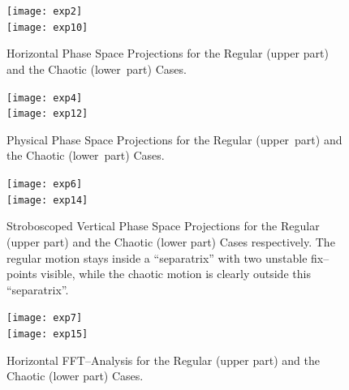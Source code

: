 \documentclass[a4paper,11pt]{report}
\begin{document}
\begin{figure}[H]
\begin{center}
  \mbox{\texttt{[image: exp2]}}
  \\[5mm]
  \mbox{\texttt{[image: exp10]}}
 \caption{Horizontal Phase Space Projections for the
   Regular (upper part) and the Chaotic \mbox{(lower part)} Cases.}
 \label{H-proj}
\end{center}
\end{figure}

\begin{figure}[H]
\begin{center}
  \mbox{\texttt{[image: exp4]}}
  \\[5mm]
  \mbox{\texttt{[image: exp12]}}
 \caption{Physical Phase Space Projections for the Regular
   \mbox{(upper part)} and the Chaotic \mbox{(lower part)} Cases.}
 \label{P-proj}
\end{center}
\end{figure}

\begin{figure}[H]
\begin{center}
  \mbox{\texttt{[image: exp6]}}
  \\[5mm]
  \mbox{\texttt{[image: exp14]}}
 \caption{\small{Stroboscoped Vertical Phase Space Projections
     for the Regular (upper part) and the Chaotic (lower part) Cases
     respectively.  The regular motion stays inside a ``separatrix''
     with two unstable fix--points visible, while the chaotic motion
     is clearly outside this ``separatrix''.}}
 \label{P-stro}
\end{center}
\end{figure}

\begin{figure}[H]
\begin{center}
  \mbox{\texttt{[image: exp7]}}
  \\[5mm]
  \mbox{\texttt{[image: exp15]}}
 \caption{Horizontal FFT--Analysis for the Regular (upper part)
   and the Chaotic (lower part) Cases.}
 \label{P-FFT}
\end{center}
\end{figure}
\end{document}
